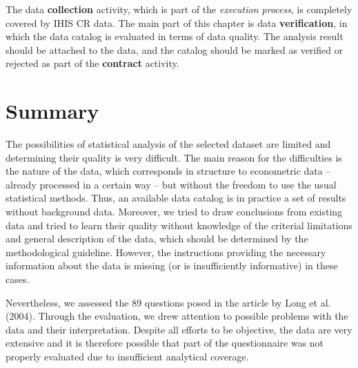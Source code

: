 The data \textbf{collection} activity, which is part of the \textit{execution process}, is completely covered by IHIS CR data.
The main part of this chapter is data \textbf{verification}, in which the data catalog is evaluated in terms of data quality.
The analysis result should be attached to the data, and the catalog should be marked as verified or rejected as part of the \textbf{contract} activity.

\section{Summary}

The possibilities of statistical analysis of the selected dataset are limited and determining their quality is very difficult.
The main reason for the difficulties is the nature of the data, which corresponds in structure to econometric data – already processed in a certain way – but without the freedom to use the usual statistical methods.
Thus, an available data catalog is in practice a set of results without background data.
Moreover, we tried to draw conclusions from existing data and tried to learn their quality without knowledge of the criterial limitations and general description of the data, which should be determined by the methodological guideline.
However, the instructions providing the necessary information about the data is missing (or is insufficiently informative) in these cases.

Nevertheless, we assessed the 89 questions posed in the article by Long et al. (2004).
Through the evaluation, we drew attention to possible problems with the data and their interpretation.
Despite all efforts to be objective, the data are very extensive and it is therefore possible that part of the questionnaire was not properly evaluated due to insufficient analytical coverage.


